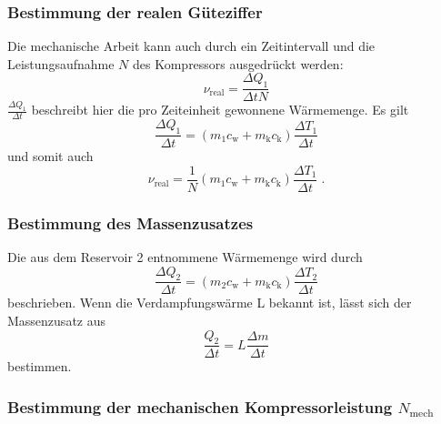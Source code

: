 \subsubsection{Bestimmung der realen Güteziffer}

    Die mechanische Arbeit kann auch durch ein Zeitintervall und die Leistungsaufnahme $N$ des Kompressors ausgedrückt werden:
    \begin{equation}
        \nu_\text{real} = \frac{\Delta Q_1}{\Delta t N}
    \end{equation}
    $\frac{\Delta Q_1}{\Delta t}$ beschreibt hier die pro Zeiteinheit gewonnene Wärmemenge. Es gilt
    \begin{equation}
        \frac{\Delta Q_1}{\Delta t} = (m_1 c_\text{w} + m_\text{k} c_\text{k}) \frac{\Delta T_1}{\Delta t}
    \end{equation}
    und somit auch
    \begin{equation}
      \label{eqn:reale_gueteziffer}
      \nu_\text{real} = \frac{1}{N} (m_1 c_\text{w} + m_\text{k} c_\text{k}) \frac{\Delta T_1}{\Delta t} \; .
    \end{equation}

\subsubsection{Bestimmung des Massenzusatzes}

    Die aus dem Reservoir 2 entnommene Wärmemenge wird durch
    \begin{equation}
        \frac{\Delta Q_2}{\Delta t} =(m_2 c_\text{w} + m_\text{k} c_\text{k}) \frac{\Delta T_2}{\Delta t}
    \end{equation}
    beschrieben.
    Wenn die Verdampfungswärme L bekannt ist, lässt sich der Massenzusatz aus
    \begin{equation}
        \frac{Q_2}{\Delta t} = L \frac{\Delta m}{\Delta t}
    \end{equation}
    bestimmen.

\subsubsection{Bestimmung der mechanischen Kompressorleistung $N_\text{mech}$}

